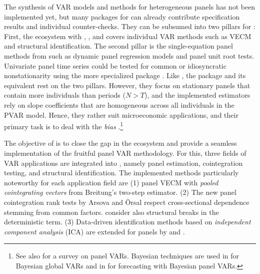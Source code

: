 The synthesis of VAR models and methods for heterogeneous panels has not been implemented yet, but many packages for  \citep{RCore2026} can already contribute specification results and individual counter-checks. They can be subsumed into two pillars for : First, the  ecosystem with  \citep{Pfaff2008},  \citep{Pfaff2008a}, and  \citep{LangeEtAl_fc} covers individual VAR methods such as VECM and structural identification. The second pillar is the single-equation panel methods from  \citep{CroissantMillo2008} such as dynamic panel regression models and panel unit root tests. Univariate panel time series could be tested for common or idiosyncratic nonstationarity using the more specialized package  \citep{Bronder2016}. Like , the  package  \citep{SigmundFerstl2019} and its  equivalent  \citep{AbrigoLove2016} rest on the two pillars. However, they focus on stationary panels that contain more individuals than periods ($ N > T $), and the implemented estimators rely on slope coefficients that are homogeneous across all individuals in the PVAR model. Hence, they rather suit microeconomic applications, and their primary task is to deal with the \textit{\citeauthor{Nickell1981} bias} \citeyearpar{Nickell1981}.\footnote{See also \citet{CanovaCiccarelli2013} for a survey on panel VARs. Bayesian techniques are used in  \citep{BoeckEtAl2022} for Bayesian global VARs and in  \citep{SanchezWozniak2026} for forecasting with Bayesian panel VARs.}

The objective of  is to close the gap in the  ecosystem and provide a seamless implementation of the fruitful panel VAR methodology. For this, three fields of VAR applications are integrated into , namely  panel estimation, cointegration testing, and structural identification. The implemented methods particularly noteworthy for each application field are (1) panel VECM with \textit{pooled cointegrating vectors} from Breitung's \citeyearpar{Breitung2005} two-step estimator. (2) The new panel cointegration rank tests by Arsova and Örsal \citeyearpar{OersalArsova2017,ArsovaOersal2018} respect cross-sectional dependence stemming from common factors. \citet{ArsovaOersal2021} consider also structural breaks in the deterministic term. (3) Data-driven identification methods based on \textit{independent component analysis} (ICA) are extended for panels by \citet{CalhounEtAl2001} and \citet{HerwartzWang2024}.

